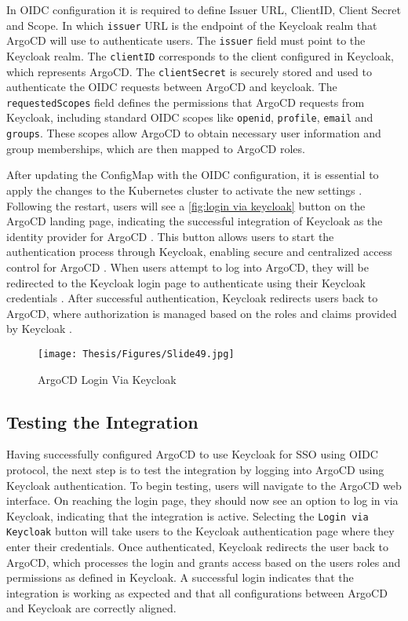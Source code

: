 In OIDC configuration it is required to define Issuer URL, ClientID, Client Secret and Scope. In which \texttt{issuer} URL is the endpoint of the Keycloak realm that ArgoCD will use to authenticate users. The \texttt{issuer} field must point to the Keycloak realm. The \texttt{clientID} corresponds to the client configured in Keycloak, which represents ArgoCD. The \texttt{clientSecret} is securely stored and used to authenticate the OIDC requests between ArgoCD and keycloak.
The \texttt{requestedScopes} field defines the permissions that ArgoCD requests from Keycloak, including standard OIDC scopes like \texttt{openid}, \texttt{profile}, \texttt{email} and \texttt{groups}. These scopes allow ArgoCD to obtain necessary user information and group memberships, which are then mapped to ArgoCD roles. \cite{argocd_docs}

\clearpage

After updating the ConfigMap with the OIDC configuration, it is essential to apply the changes to the Kubernetes cluster to activate the new settings \cite{argocd_docs}. Following the restart, users will see a \autoref{fig:login via keycloak} button on the ArgoCD landing page, indicating the successful integration of Keycloak as the identity provider for ArgoCD \cite{argocd_docs}. This button allows users to start the authentication process through Keycloak, enabling secure and centralized access control for ArgoCD \cite{argocd_docs}. When users attempt to log into ArgoCD, they will be redirected to the Keycloak login page to authenticate using their Keycloak credentials \cite{keycloak_doc}. After successful authentication, Keycloak redirects users back to ArgoCD, where authorization is managed based on the roles and claims provided by Keycloak \cite{keycloak_doc}.

\begin{figure}[h]
\centering
\texttt{[image: Thesis/Figures/Slide49.jpg]}
\caption{\label{fig:login via keycloak}ArgoCD Login Via Keycloak}
\end{figure}

\subsection{Testing the Integration}

Having successfully configured ArgoCD to use Keycloak for SSO using OIDC protocol, the next step is to test the integration by logging into ArgoCD using Keycloak authentication. To begin testing, users will navigate to the ArgoCD web interface. On reaching the login page, they should now see an option to log in via Keycloak, indicating that the integration is active. Selecting the \texttt{Login via Keycloak} button will take users to the Keycloak authentication page where they enter their credentials. Once authenticated, Keycloak redirects the user back to ArgoCD, which processes the login and grants access based on the users roles and permissions as defined in Keycloak. A successful login indicates that the integration is working as expected and that all configurations between ArgoCD and Keycloak are correctly aligned.

